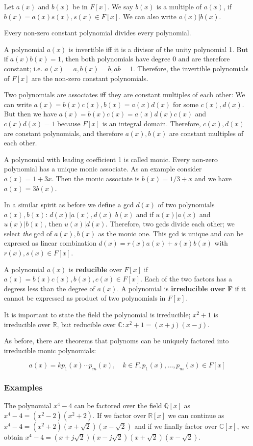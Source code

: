 Let \(a(x)\) and \(b(x)\) be in \(F[x]\). We say \(b(x)\) is a multiple
of \(a(x)\), if \(b(x) = a(x) s(x), s(x) \in F[x]\). We can also write
\(a(x)|b(x)\).

Every non-zero constant polynomial divides every polynomial.

A polynomial \(a(x)\) is invertible iff it is a divisor of the unity
polynomial 1. But if \(a(x)b(x)=1\), then both polynomials have degree 0
and are therefore constant; i.e. \(a(x)=a, b(x)=b, ab=1\). Therefore,
the invertible polynomials of \(F[x]\) are the non-zero constant
polynomials.

Two polynomials are associates iff they are constant multiples of each
other: We can write \(a(x) = b(x)c(x), b(x) = a(x)d(x)\) for some
\(c(x), d(x)\). But then we have \(a(x) = b(x)c(x) = a(x)d(x)c(x)\) and
\(c(x)d(x)=1\) because \(F[x]\) is an integral domain. Therefore,
\(c(x), d(x)\) are constant polynomials, and therefore \(a(x), b(x)\)
are constant multiples of each other.

A polynomial with leading coefficient 1 is called monic. Every non-zero
polynomial has a unique monic associate. As an example consider
\(a(x)=1+3x\). Then the monic associate is \(b(x) = 1/3 + x\) and we
have \(a(x) = 3b(x)\).

In a similar spirit as before we define a gcd \(d(x)\) of two
polynomials \(a(x), b(x)\): \(d(x)|a(x), d(x)|b(x)\) and if
\(u(x)|a(x)\) and \(u(x)|b(x)\), then \(u(x)|d(x)\). Therefore, two gcds
divide each other; we select \emph{the} gcd of \(a(x), b(x)\) as the
monic one. This gcd is unique and can be expresed as linear combination
\(d(x) = r(x)a(x) + s(x)b(x)\) with \(r(x), s(x) \in F[x]\).

A polynomial \(a(x)\) is \textbf{reducible} over \(F[x]\) if
\(a(x)=b(x)c(x), b(x), c(x) \in F[x]\). Each of the two factors has a
degress less than the degree of \(a(x)\). A polynomial is
\textbf{irreducible over F} if it cannot be expressed as product of two
polynomials in \(F[x]\).

It is important to state the field the polynomial is irreducible;
\(x^2+1\) is irreducible over \(\mathbb{R}\), but reducible over
\(\mathbb{C}: x^2+1 = (x+j)(x-j)\).

As before, there are theorems that polynoms can be uniquely factored
into irreducible monic polynomials:

\[
a(x) = k p_1(x) \cdots p_m(x), \quad k \in F, p_1(x), \ldots,p_m(x) \in F[x]
\]

\subsubsection{Examples}\label{examples}

The polynomial \(x^4-4\) can be factored over the field
\(\mathbb{Q}[x]\) as \(x^4-4 = (x^2-2)(x^2+2)\). If we factor over
\(\mathbb{R}[x]\) we can continue as
\(x^4-4 = (x^2+2)(x+\sqrt{2})(x-\sqrt{2})\) and if we finally factor
over \(\mathbb{C}[x]\), we obtain
\(x^4-4 = (x+j\sqrt{2})(x-j\sqrt{2})(x+\sqrt{2})(x-\sqrt{2})\).
